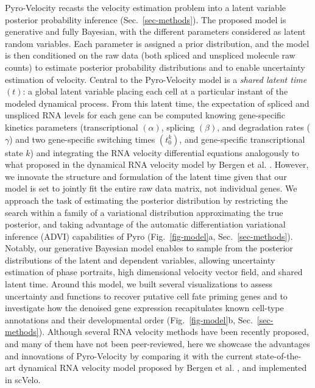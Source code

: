 \documentclass[
  sn-mathphys-num,
  lineno,
  twocolumn]{sn-jnl}
\begin{document}
Pyro-Velocity recasts the velocity estimation problem into a latent
variable posterior probability inference (Sec.~\ref{sec-methods}). The
proposed model is generative and fully Bayesian, with the different
parameters considered as latent random variables. Each parameter is
assigned a prior distribution, and the model is then conditioned on the
raw data (both spliced and unspliced molecule raw counts) to estimate
posterior probability distributions and to enable uncertainty estimation
of velocity. Central to the Pyro-Velocity model is a \emph{shared latent
time} \((t)\): a global latent variable placing each cell at a
particular instant of the modeled dynamical process. From this latent
time, the expectation of spliced and unspliced RNA levels for each gene
can be computed knowing gene-specific kinetics parameters
(transcriptional \((\alpha)\), splicing \((\beta)\), and degradation
rates (\(\gamma\)) and two gene-specific switching times
\((t_{0}^{k})\), and gene-specific transcriptional state \(k\)) and
integrating the RNA velocity differential equations analogously to what
proposed in the dynamical RNA velocity model by Bergen et al.
\citep{Bergen2020-pj, Li2021-qa}. However, we innovate the structure and
formulation of the latent time given that our model is set to jointly
fit the entire raw data matrix, not individual genes. We approach the
task of estimating the posterior distribution by restricting the search
within a family of a variational distribution approximating the true
posterior, and taking advantage of the automatic differentiation
variational inference (ADVI) capabilities of Pyro
\citep{Bingham2018-id, Kucukelbir2016-bk} (Fig.~\ref{fig-model}a,
Sec.~\ref{sec-methods}). Notably, our generative Bayesian model enables
to sample from the posterior distributions of the latent and dependent
variables, allowing uncertainty estimation of phase portraits, high
dimensional velocity vector field, and shared latent time. Around this
model, we built several visualizations to assess uncertainty and
functions to recover putative cell fate priming genes and to investigate
how the denoised gene expression recapitulates known cell-type
annotations and their developmental order (Fig.~\ref{fig-model}b,
Sec.~\ref{sec-methods}). Although several RNA velocity methods
\citep{Gayoso2024-fz, Gorin2022-il, Gu2022-rh, Cui2022-em, Gao2022-jq}
have been recently proposed, and many of them have not been
peer-reviewed, here we showcase the advantages and innovations of
Pyro-Velocity by comparing it with the current state-of-the-art
dynamical RNA velocity model proposed by Bergen et al.
\citep{Bergen2020-pj}, and implemented in scVelo.
\end{document}

